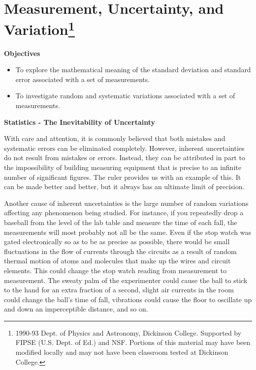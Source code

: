 
\section{Measurement, Uncertainty, and Variation\footnote{
1990-93 Dept. of Physics and Astronomy, Dickinson College. Supported by FIPSE
(U.S. Dept. of Ed.) and NSF. Portions of this material may have been modified
locally and may not have been classroom tested at Dickinson College.
}}

\makelabheader %

\textbf{Objectives }

\begin{itemize}
\item To explore the mathematical meaning of the standard deviation and standard error
associated with a set of measurements. 
\item To investigate random and systematic variations associated with a set of measurements.
\end{itemize}
\textbf{Statistics - The Inevitability of Uncertainty }

With care and attention, it is commonly believed that both mistakes and systematic
errors can be eliminated completely. However, inherent uncertainties do not
result from mistakes or errors. Instead, they can be attributed in part to the
impossibility of building measuring equipment that is precise to an infinite
number of significant figures. The ruler provides us with an example of this.
It can be made better and better, but it always has an ultimate limit of precision.

Another cause of inherent uncertainties is the large number of random variations
affecting any phenomenon being studied. For instance, if you repeatedly drop
a baseball from the level of the lab table and measure the time of each fall,
the measurements will most probably not all be the same. Even if the stop watch
was gated electronically so as to be as precise as possible, there would be
small fluctuations in the flow of currents through the circuits as a result
of random thermal motion of atoms and molecules that make up the wires and circuit
elements. This could change the stop watch reading from measurement to measurement.
The sweaty palm of the experimenter could cause the ball to stick to the hand
for an extra fraction of a second, slight air currents in the room could change
the ball's time of fall, vibrations could cause the floor to oscillate up and
down an imperceptible distance, and so on.

